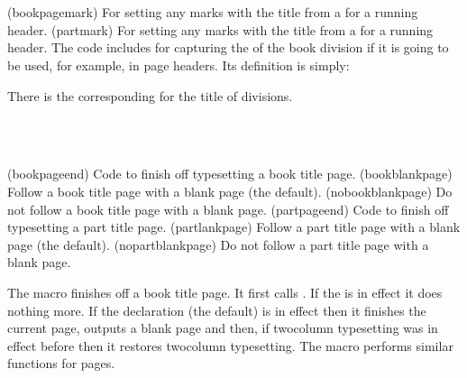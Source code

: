 \begin{syntax}
\cmd{\bookpagemark} \\
\cmd{\partmark} \\
\end{syntax}
\glossary(bookpagemark)%
  {}%
  {For setting any marks with the title from a  for a running header.}
\glossary(partmark)%
  {}%
  {For setting any marks with the title from a  for a running header.}
The \cmd{\book} code includes \cmd{\bookpagemark} for capturing
the  of the book division if it is going to be used,
for example, in page headers. Its definition is simply:
\begin{lcode}
\newcommand*{\bookpagemark}[1]{}
\end{lcode}
There is the corresponding \cmd{\partmark} for the title of \cmd{\part}
divisions.

\begin{syntax}
\cmd{\bookpageend} \cmd{\bookblankpage} \cmd{\nobookblankpage} \\
\cmd{\partpageend} \cmd{\partblankpage} \cmd{\nopartblankpage} \\
\end{syntax}
\glossary(bookpageend)%
  {}%
  {Code to finish off typesetting a book title page.}
\glossary(bookblankpage)%
  {}%
  {Follow a book title page with a blank page (the default).}
\glossary(nobookblankpage)%
  {}%
  {Do not follow a book title page with a blank page.}
\glossary(partpageend)%
  {}%
  {Code to finish off typesetting a part title page.}
\glossary(partlankpage)%
  {}%
  {Follow a part title page with a blank page (the default).}
\glossary(nopartblankpage)%
  {}%
  {Do not follow a part title page with a blank page.}

The macro \cmd{\bookpageend} finishes off a book title page. It first
calls \cmd{\afterbookskip}. If the \cmd{\nobookblankpage} is in effect
it does nothing more. If the declaration \cmd{\bookblankpage} (the default)
is in effect then it finishes the current page, outputs a blank page and then,
if twocolumn typesetting was in effect before \cmd{\book} then it restores
twocolumn typesetting. The macro \cmd{\partpageend} performs similar
functions for \cmd{\part} pages.

